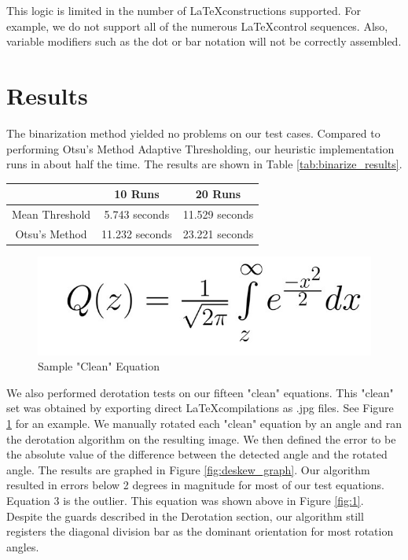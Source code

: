 \documentclass[journal]{IEEEtran}
\begin{document}
This logic is limited in the number of \LaTeX constructions supported. For example, we do not support all of the numerous \LaTeX control sequences. Also, variable modifiers such as the dot or bar notation will not be correctly assembled.

\section{Results}
The binarization method yielded no problems on our test cases. Compared to performing Otsu's Method Adaptive Thresholding, our heuristic implementation runs in about half the time. The results are shown in Table \ref{tab:binarize_results}.
\begin{center}
\begin{minipage}{\columnwidth}
     \label{tab:binarize_results} 
    \centering
    \begin{tabular}{|c|c|c|}
        \hline
        & 10 Runs &	20 Runs \\
        \hline
         Mean Threshold &	5.743 seconds &	11.529 seconds\\
        \hline
        Otsu’s Method	& 11.232 seconds &23.221 seconds\\
        \hline
    \end{tabular}    
\end{minipage}
\end{center}

\begin{figure}[!t]
    \centering
    \includegraphics[width=\columnwidth]{clean}
    \caption{Sample "Clean" Equation}
    \label{fig:clean}
\end{figure}

We also performed derotation tests on our fifteen "clean" equations. This "clean" set was obtained by exporting direct \LaTeX compilations as .jpg files. See Figure \ref{fig:clean} for an example. We manually rotated each "clean" equation by an angle and ran the derotation algorithm on the resulting image. We then defined the error to be the absolute value of the difference between the detected angle and the rotated angle. The results are graphed in Figure \ref{fig:deskew_graph}. Our algorithm resulted in errors below 2 degrees in magnitude for most of our test equations. Equation 3 is the outlier. This equation was shown above in Figure \ref{fig:1}. Despite the guards described in the Derotation section, our algorithm still registers the diagonal division bar as the dominant orientation for most rotation angles.
\end{document}
